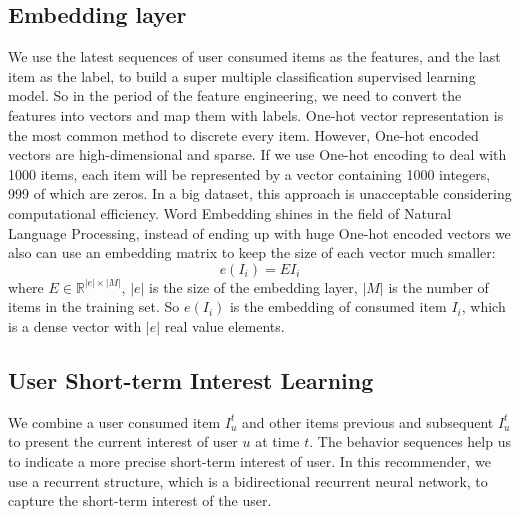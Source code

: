 \documentclass[runningheads]{llncs}
\begin{document}
\subsection{Embedding layer}
 We use the latest sequences of user consumed items as the features, and the last item as the label, to build a super multiple classification supervised learning model. So in the period of the feature engineering, we need to convert the features into vectors and map them with labels. One-hot vector representation is the most common method to discrete every item. However, One-hot encoded vectors are high-dimensional and sparse. If we use One-hot encoding to deal with 1000 items, each item will be represented by a vector containing 1000 integers, 999 of which are zeros. In a big dataset, this approach is unacceptable considering computational efficiency. Word Embedding shines in the field of Natural Language Processing, instead of ending up with huge One-hot encoded vectors we also can use an embedding matrix to keep the size of each vector much smaller:
 \begin{equation}
e(I_{i})=EI_{i}
\end{equation}
where $E\in \mathbb{R}^{|e|\times |M|}$, $|e|$ is the size of the embedding layer, $|M|$ is the number of items in the training set. So $e(I_{i})$ is the embedding of consumed item $I_{i}$, which is a dense vector with $|e|$ real value elements.

\subsection{User Short-term Interest Learning}
We combine a user consumed item $I_{u}^{t}$ and other items previous and subsequent $I_{u}^{t}$ to present the current interest of user $u$ at time $t$. The behavior sequences help us to indicate a more precise short-term interest of user. In this recommender, we use a recurrent structure, which is a bidirectional recurrent neural network, to capture the short-term interest of the user.
\end{document}
